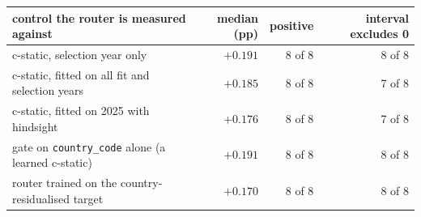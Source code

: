 \begin{tabular}{lrrr}
\toprule
control the router is measured against & median (pp) & positive & interval excludes 0 \\
\midrule
c-static, selection year only & $+0.191$ & 8 of 8 & 8 of 8 \\
c-static, fitted on all fit and selection years & $+0.185$ & 8 of 8 & 7 of 8 \\
c-static, fitted on 2025 with hindsight & $+0.176$ & 8 of 8 & 7 of 8 \\
gate on \texttt{country\_code} alone (a learned c-static) & $+0.191$ & 8 of 8 & 8 of 8 \\
router trained on the country-residualised target & $+0.170$ & 8 of 8 & 8 of 8 \\
\bottomrule
\end{tabular}

